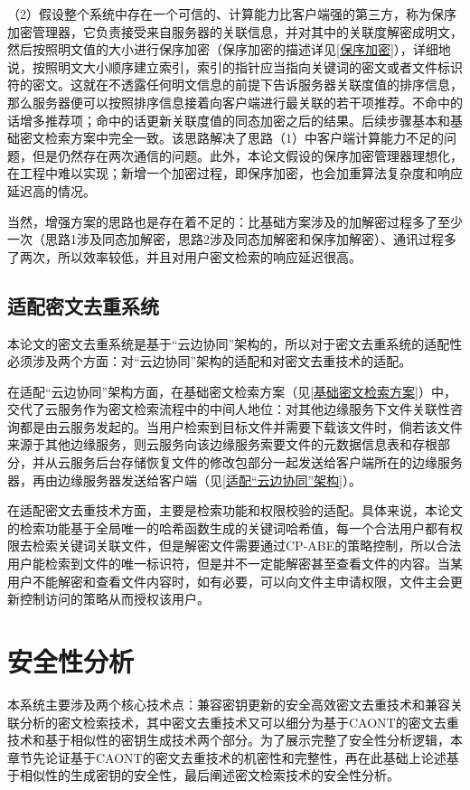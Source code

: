 \documentclass[promaster]{thesis-uestc}
\begin{document}
（2）假设整个系统中存在一个可信的、计算能力比客户端强的第三方，称为保序加密管理器，它负责接受来自服务器的关联信息，并对其中的关联度解密成明文，然后按照明文值的大小进行保序加密（保序加密的描述详见\ref{保序加密}），详细地说，按照明文大小顺序建立索引，索引的指针应当指向关键词的密文或者文件标识符的密文。这就在不透露任何明文信息的前提下告诉服务器关联度值的排序信息，那么服务器便可以按照排序信息接着向客户端进行最关联的若干项推荐。不命中的话增多推荐项；命中的话更新关联度值的同态加密之后的结果。后续步骤基本和基础密文检索方案中完全一致。该思路解决了思路（1）中客户端计算能力不足的问题，但是仍然存在两次通信的问题。此外，本论文假设的保序加密管理器理想化，在工程中难以实现；新增一个加密过程，即保序加密，也会加重算法复杂度和响应延迟高的情况。

当然，增强方案的思路也是存在着不足的：比基础方案涉及的加解密过程多了至少一次（思路1涉及同态加解密，思路2涉及同态加解密和保序加解密）、通讯过程多了两次，所以效率较低，并且对用户密文检索的响应延迟很高。



\subsection{适配密文去重系统}
本论文的密文去重系统是基于“云边协同”架构的，所以对于密文去重系统的适配性必须涉及两个方面：对“云边协同”架构的适配和对密文去重技术的适配。

在适配“云边协同”架构方面，在基础密文检索方案（见\ref{基础密文检索方案}）中，交代了云服务作为密文检索流程中的中间人地位：对其他边缘服务下文件关联性咨询都是由云服务发起的。当用户检索到目标文件并需要下载该文件时，倘若该文件来源于其他边缘服务，则云服务向该边缘服务索要文件的元数据信息表和存根部分，并从云服务后台存储恢复文件的修改包部分一起发送给客户端所在的边缘服务器，再由边缘服务器发送给客户端（见\ref{适配“云边协同”架构}）。

在适配密文去重技术方面，主要是检索功能和权限校验的适配。具体来说，本论文的检索功能基于全局唯一的哈希函数生成的关键词哈希值，每一个合法用户都有权限去检索关键词关联文件，但是解密文件需要通过CP-ABE的策略控制，所以合法用户能检索到文件的唯一标识符，但是并不一定能解密甚至查看文件的内容。当某用户不能解密和查看文件内容时，如有必要，可以向文件主申请权限，文件主会更新控制访问的策略从而授权该用户。

\section{安全性分析}
本系统主要涉及两个核心技术点：兼容密钥更新的安全高效密文去重技术和兼容关联分析的密文检索技术，其中密文去重技术又可以细分为基于CAONT的密文去重技术和基于相似性的密钥生成技术两个部分。为了展示完整了安全性分析逻辑，本章节先论证基于CAONT的密文去重技术的机密性和完整性，再在此基础上论述基于相似性的生成密钥的安全性，最后阐述密文检索技术的安全性分析。
\end{document}
